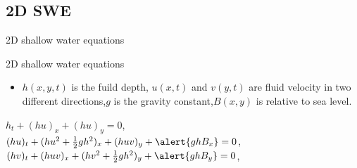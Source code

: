 \documentclass{beamer}
\begin{document}
\subsection{2D SWE}
\begin{frame}{2D shallow water equations}

	\begin{block}{2D shallow water equations}
      \begin{itemize}
        \item $h(x,y,t)$ is the fuild depth, $u(x,t)$ and $v(y,t)$ are fluid velocity in two different directions,$g$ is the gravity constant,$B(x,y)$ is relative to sea level.
        
      \end{itemize}
      \begin{center}
      	$h_{t} + (hu)_{x} + (hu)_{y} = 0$,\\
$(hu)_{t} + (hu^{2} + \frac{1}{2}gh^{2})_{x}+(huv)_{y} + \alert{ghB_{x}} =0$,\\
$(hv)_{t} +(huv)_{x} + (hv^{2} + \frac{1}{2}gh^{2})_{y}+ \alert{ghB_{y}}=0$,\\
	  \end{center}
    \end{block}

\end{frame}
\end{document}
